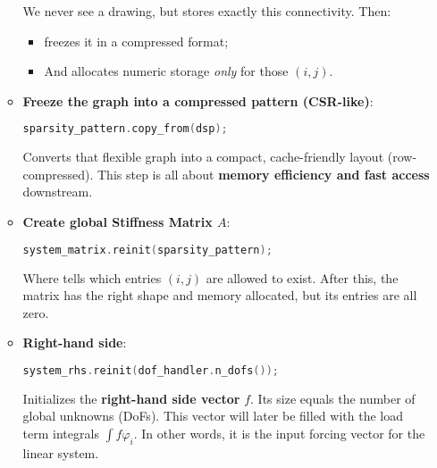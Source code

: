 \begin{enumerate}
\begin{itemize}
\begin{examplebox}[: Graph 1D]
\begin{center}
            \end{center}
            We never see a drawing, but  stores exactly this connectivity. Then:
            \begin{itemize}
                \item {} freezes it in a compressed format;
                \item And  allocates numeric storage \emph{only} for those $(i, j)$.
            \end{itemize}
        \end{examplebox}
        \newpage
        \item \textbf{Freeze the graph into a compressed pattern (CSR-like)}:
        \begin{lstlisting}[language=C++]
sparsity_pattern.copy_from(dsp);\end{lstlisting}
        Converts that flexible graph into a compact, cache-friendly layout (row-compressed). This step is all about \textbf{memory efficiency and fast access} downstream.

        \item \textbf{Create global Stiffness Matrix $A$}:
        \begin{lstlisting}[language=C++]
system_matrix.reinit(sparsity_pattern);\end{lstlisting}
        Where  tells which entries $(i,j)$ are allowed to exist. After this, the matrix has the right shape and memory allocated, but its entries are all zero.
        
        \item \textbf{Right-hand side}:
        \begin{lstlisting}[language=C++]
system_rhs.reinit(dof_handler.n_dofs());\end{lstlisting}
        Initializes the \textbf{right-hand side vector} $f$. Its size equals the number of global unknowns (DoFs). This vector will later be filled with the load term integrals $\displaystyle\int f \varphi_{i}$. In other words, it is the input forcing vector for the linear system.


\end{itemize}
\end{enumerate}
